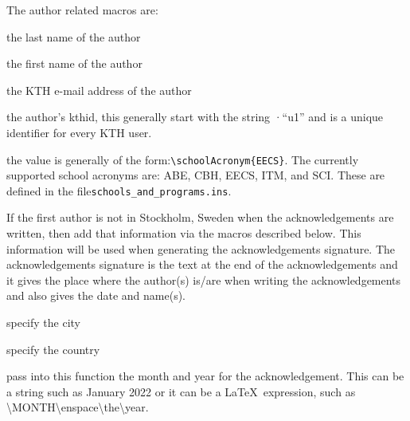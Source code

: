 \documentclass[examplethesis.tex]{subfiles}
\begin{document}
The author related macros are:
\begin{description}[leftmargin=!, labelwidth =\widthof{\texttt{\textbackslash secondAuthorsFirstname\{\}}}]
\item [\texttt{\textbackslash authorsLastname\{\}}] the last name of the author

\item [\texttt{\textbackslash authorsFirstname\{\}}] the first name of the author

\item [\texttt{\textbackslash email\{\}}] the KTH e-mail address of the author

\item [\texttt{\textbackslash kthid\{\}}] the author's kthid, this generally start with the string ·``u1'' and is a unique identifier for every KTH user.

\item [\texttt{\textbackslash authorsSchool\{\}}] the value is generally of the form:\linebreak[4] \texttt{\textbackslash schoolAcronym\{EECS\}}. The currently supported school acronyms are: ABE, CBH, EECS, ITM, and SCI. These are defined in the file\linebreak[4] \texttt{schools\_and\_programs.ins}.
\end{description}

If the first author is not in Stockholm, Sweden when the acknowledgements are written, then add that information via the macros described below.
This information will be used when generating the acknowledgements signature. The acknowledgements signature is the text at the end of the acknowledgements and it gives the place where the author(s) is/are when writing the acknowledgements and also gives the date and name(s).
\begin{description}[leftmargin=!, labelwidth =\widthof{\texttt{\textbackslash secondAuthorsFirstname\{\}}}]
\item [\texttt{\textbackslash authorCity\{A City\}}] specify the city

\item [\texttt{\textbackslash authorCountry\{A Country\}}] specify the country

\item [\texttt{\textbackslash authorCityCountryDate\{\}}] pass into this function the month and year for the acknowledgement. This can be a string such as January 2022 or it can be a \LaTeX\ expression, such as \textbackslash MONTH\textbackslash enspace\textbackslash the\textbackslash year.
\end{description}
\end{document}
